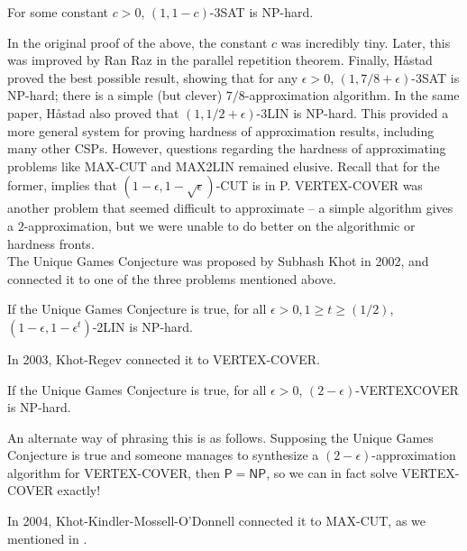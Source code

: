 	\begin{theorem}
		For some constant $c > 0$, $(1,1-c)$-3SAT is \textsf{NP}-hard.
	\end{theorem}
	In the original proof of the above, the constant $c$ was incredibly tiny. Later, this was improved by Ran Raz \cite{raz-parallel-reptn} in the parallel repetition theorem. Finally, H\r{a}stad \cite{hastad-appx-3sat} proved the best possible result, showing that for any $\epsilon > 0$, $(1,7/8 + \epsilon)$-3SAT is \textsf{NP}-hard; there is a simple (but clever) $7/8$-approximation algorithm. In the same paper, H\r{a}stad also proved that $(1,1/2+\epsilon)$-3LIN is \textsf{NP}-hard. This provided a more general system for proving hardness of approximation results, including many other CSPs. However, questions regarding the hardness of approximating problems like MAX-CUT and MAX2LIN remained elusive. Recall that for the former,  implies that $(1-\epsilon,1-\sqrt{\epsilon})$-CUT is in \textsf{P}. VERTEX-COVER was another problem that seemed difficult to approximate -- a simple algorithm gives a $2$-approximation, but we were unable to do better on the algorithmic or hardness fronts.\\

	The Unique Games Conjecture was proposed by Subhash Khot \cite{ugc-og} in 2002, and connected it to one of the three problems mentioned above.

	\begin{theorem}[Khot]
		If the Unique Games Conjecture is true, for all $\epsilon > 0, 1 \ge t \ge (1/2)$, $(1-\epsilon,1-\epsilon^t)$-2LIN is \textsf{NP}-hard.
	\end{theorem}

	In 2003, Khot-Regev \cite{khot-regev-ugc-vtxcov} connected it to VERTEX-COVER.

	\begin{theorem}
		If the Unique Games Conjecture is true, for all $\epsilon > 0$, $(2-\epsilon)$-VERTEXCOVER is \textsf{NP}-hard.
	\end{theorem}
	An alternate way of phrasing this is as follows. Supposing the Unique Games Conjecture is true and someone manages to synthesize a $(2-\epsilon)$-approximation algorithm for VERTEX-COVER, then $\mathsf{P} = \mathsf{NP}$, so we can in fact solve VERTEX-COVER exactly!

	In 2004, Khot-Kindler-Mossell-O'Donnell \cite{max-cut-ugc} connected it to MAX-CUT, as we mentioned in .

